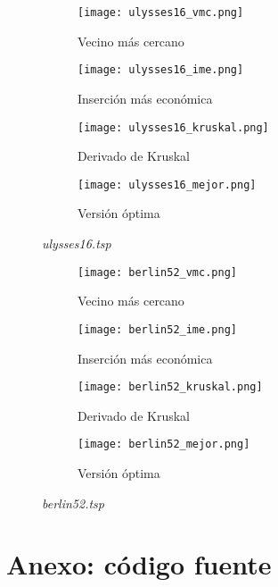 \documentclass[12pt,spanish]{article}
\begin{document}
\begin{figure}[H]
\centering
\begin{subfigure}[b]{0.36\textwidth}
\texttt{[image: ulysses16\_vmc.png]}
\caption{Vecino más cercano}
\end{subfigure}
\quad
\begin{subfigure}[b]{0.36\textwidth}
\texttt{[image: ulysses16\_ime.png]}
\caption{Inserción más económica}
\end{subfigure}

\vspace{1cm}

\begin{subfigure}[b]{0.36\textwidth}
\texttt{[image: ulysses16\_kruskal.png]}
\caption{Derivado de Kruskal}
\end{subfigure}
\quad
\begin{subfigure}[b]{0.36\textwidth}
\texttt{[image: ulysses16\_mejor.png]}
\caption{Versión óptima}
\end{subfigure}
\caption{\textit{ulysses16.tsp}}
\end{figure}

\begin{figure}[H]
\centering
\begin{subfigure}[b]{0.36\textwidth}
\texttt{[image: berlin52\_vmc.png]}
\caption{Vecino más cercano}
\end{subfigure}
\quad
\begin{subfigure}[b]{0.36\textwidth}
\texttt{[image: berlin52\_ime.png]}
\caption{Inserción más económica}
\end{subfigure}

\vspace{1cm}

\begin{subfigure}[b]{0.36\textwidth}
\texttt{[image: berlin52\_kruskal.png]}
\caption{Derivado de Kruskal}
\end{subfigure}
\quad
\begin{subfigure}[b]{0.36\textwidth}
\texttt{[image: berlin52\_mejor.png]}
\caption{Versión óptima}
\end{subfigure}
\caption{\textit{berlin52.tsp}}
\end{figure}



\newpage
\section{Anexo: código fuente}
\end{document}
